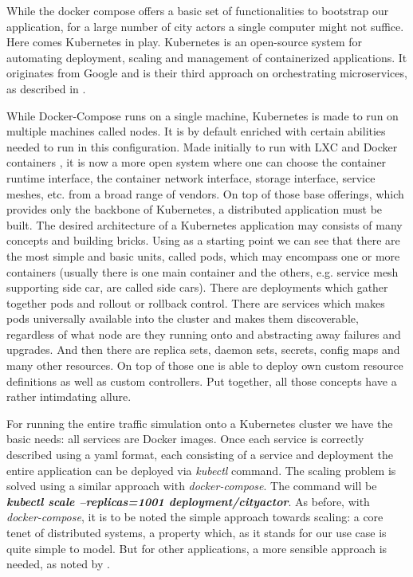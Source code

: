 \documentclass[conference]{IEEEtran}
\begin{document}
While the docker compose offers a basic set of functionalities to bootstrap our application, for a large number of city actors a single computer might not suffice. Here comes Kubernetes in play. Kubernetes \citep{Kubernetes} is an open-source system for automating deployment, scaling and management of containerized applications. It originates from Google and is their third approach on orchestrating microservices, as described in \cite{burns2016borg}.

While Docker-Compose runs on a single machine, Kubernetes is made to run on multiple machines called nodes. It is by default enriched with certain abilities needed to run in this configuration. Made initially to run with LXC and Docker containers \citep{7036275}, it is now a more open system where one can choose the container runtime interface, the container network interface, storage interface, service meshes, etc. from a broad range of vendors. On top of those base offerings, which provides only the backbone of Kubernetes, a distributed application must be built. The desired architecture of a Kubernetes application may consists of many concepts and building bricks. Using \cite{hightower2017kubernetes} as a starting point we can see that there are the most simple and basic units, called pods, which may encompass one or more containers (usually there is one main container and the others, e.g. service mesh supporting side car, are called side cars). There are deployments which gather together pods and rollout or rollback control. There are services which makes pods universally available into the cluster and makes them discoverable, regardless of what node are they running onto and abstracting away failures and upgrades. And then there are replica sets, daemon sets, secrets, config maps and many other resources. On top of those one is able to deploy own custom resource definitions as well as custom controllers. Put together, all those concepts have a rather intimdating allure.

For running the entire traffic simulation onto a Kubernetes cluster we have the basic needs: all services are Docker images. Once each service is correctly described using a yaml format, each consisting of a service and deployment the entire application can be deployed via \textit{kubectl} command. The scaling problem is solved using a similar approach with \textit{docker-compose}. The command will be \textit{\textbf{kubectl scale --replicas=1001 deployment/cityactor}}. As before, with \textit{docker-compose}, it is to be noted the simple approach towards scaling: a core tenet of distributed systems, a property which, as it stands for our use case is quite simple to model. But for other applications, a more sensible approach is needed, as noted by \cite{jogalekar2000evaluating}.
\end{document}
